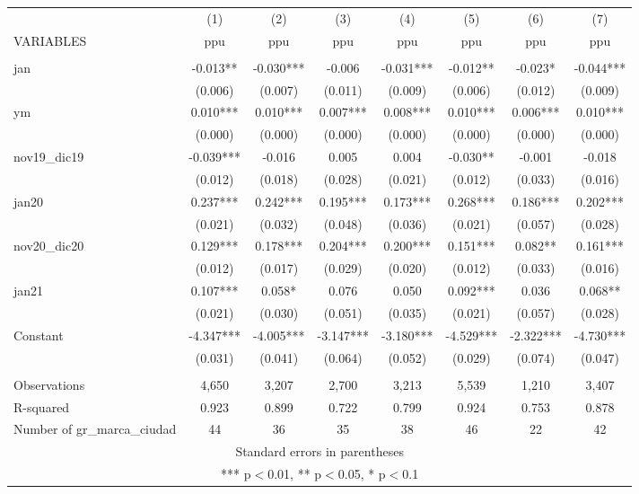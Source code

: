 \begin{tabular}{lccccccc} \hline
 & (1) & (2) & (3) & (4) & (5) & (6) & (7) \\
VARIABLES & ppu & ppu & ppu & ppu & ppu & ppu & ppu \\ \hline
 &  &  &  &  &  &  &  \\
jan & -0.013** & -0.030*** & -0.006 & -0.031*** & -0.012** & -0.023* & -0.044*** \\
 & (0.006) & (0.007) & (0.011) & (0.009) & (0.006) & (0.012) & (0.009) \\
ym & 0.010*** & 0.010*** & 0.007*** & 0.008*** & 0.010*** & 0.006*** & 0.010*** \\
 & (0.000) & (0.000) & (0.000) & (0.000) & (0.000) & (0.000) & (0.000) \\
nov19\_dic19 & -0.039*** & -0.016 & 0.005 & 0.004 & -0.030** & -0.001 & -0.018 \\
 & (0.012) & (0.018) & (0.028) & (0.021) & (0.012) & (0.033) & (0.016) \\
jan20 & 0.237*** & 0.242*** & 0.195*** & 0.173*** & 0.268*** & 0.186*** & 0.202*** \\
 & (0.021) & (0.032) & (0.048) & (0.036) & (0.021) & (0.057) & (0.028) \\
nov20\_dic20 & 0.129*** & 0.178*** & 0.204*** & 0.200*** & 0.151*** & 0.082** & 0.161*** \\
 & (0.012) & (0.017) & (0.029) & (0.020) & (0.012) & (0.033) & (0.016) \\
jan21 & 0.107*** & 0.058* & 0.076 & 0.050 & 0.092*** & 0.036 & 0.068** \\
 & (0.021) & (0.030) & (0.051) & (0.035) & (0.021) & (0.057) & (0.028) \\
Constant & -4.347*** & -4.005*** & -3.147*** & -3.180*** & -4.529*** & -2.322*** & -4.730*** \\
 & (0.031) & (0.041) & (0.064) & (0.052) & (0.029) & (0.074) & (0.047) \\
 &  &  &  &  &  &  &  \\
Observations & 4,650 & 3,207 & 2,700 & 3,213 & 5,539 & 1,210 & 3,407 \\
R-squared & 0.923 & 0.899 & 0.722 & 0.799 & 0.924 & 0.753 & 0.878 \\
 Number of gr\_marca\_ciudad & 44 & 36 & 35 & 38 & 46 & 22 & 42 \\ \hline
\multicolumn{8}{c}{ Standard errors in parentheses} \\
\multicolumn{8}{c}{ *** p$<$0.01, ** p$<$0.05, * p$<$0.1} \\
\end{tabular}
